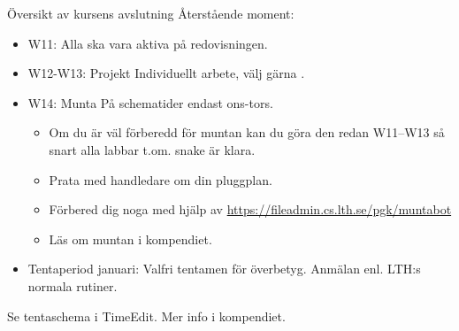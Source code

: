 
\begin{Slide}{Översikt av kursens avslutning}
Återstående moment:
\begin{itemize}
\item W11:  \hfill Alla ska vara aktiva på redovisningen.
\item W12-W13: Projekt \hfill Individuellt arbete, välj gärna .
\item W14: Munta \hfill På schematider endast ons-tors.
\begin{itemize}
\item Om du är väl förberedd för muntan kan du göra den redan W11--W13 så snart alla labbar t.om. snake är klara. 
\item Prata med handledare om din pluggplan.
\item Förbered dig noga med hjälp av \url{https://fileadmin.cs.lth.se/pgk/muntabot}
\item Läs om muntan i kompendiet.
\end{itemize}
\item Tentaperiod januari: Valfri tentamen för överbetyg. Anmälan enl. LTH:s normala rutiner. 
\end{itemize}
Se tentaschema i TimeEdit.
\ifkompendium\else
\newline
Mer info i kompendiet.
\fi
\end{Slide}




